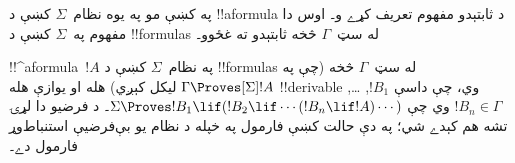 \documentclass[../../../include/open-logic-section]{subfiles}
\begin{document}


په  کښې مو په يوه نظام~$\Sigma$ کښې د
!!a{formula} د ثابتېدو مفهوم تعريف کړے و۔ اوس دا مفهوم په~$\Sigma$
کښې د !!{formula}s له سټ~$\Gamma$ څخه ثابتېدو ته غځوو۔

\begin{defn}
  !!^a{formula}~$!A$ په نظام~$\Sigma$ کښې د !!{formula}s له سټ~$\Gamma$ څخه
  (چې په $\Gamma \Proves[\Sigma] !A$ ليکل کېږي) هله او يوازې هله
  !!{derivable} وي، چې داسې $!B_1$, \dots,
  $!B_n \in \Gamma$ وي چې
  $\Sigma \Proves !B_1 \lif (!B_2 \lif \cdots (!B_n \lif !A)
  \cdots)$۔
  د فرضيو دا لړۍ تشه هم کېدے شي؛ په دې حالت کښې فارمول په
  خپله د نظام يو بې‌فرضيې استنباط‌وړ فارمول دے۔
\end{defn}
\end{document}
